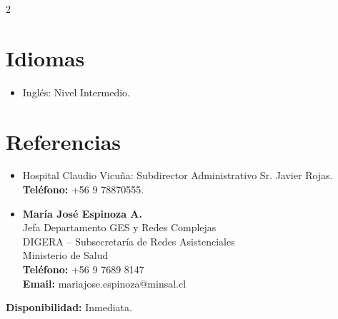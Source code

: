 \documentclass[lighthipster]{simplehipstercv}
\begin{document}
\begin{paracol}{2}
\section*{Idiomas}
\begin{itemize}
    \item Inglés: Nivel Intermedio.
\end{itemize}

\vspace{1em}


\section*{Referencias}
\begin{itemize}
    \item Hospital Claudio Vicuña: Subdirector Administrativo Sr. Javier Rojas. \\
    \textbf{Teléfono:} +56 9 78870555.
    \item \textbf{María José Espinoza A.} \\
    Jefa Departamento GES y Redes Complejas \\
    DIGERA -- Subsecretaría de Redes Asistenciales \\
    Ministerio de Salud \\
    \textbf{Teléfono:} +56 9 7689 8147 \\
    \textbf{Email:} mariajose.espinoza@minsal.cl
\end{itemize}

\vspace{1em}

\noindent \textbf{Disponibilidad:} Inmediata.


\end{paracol}
\end{document}
